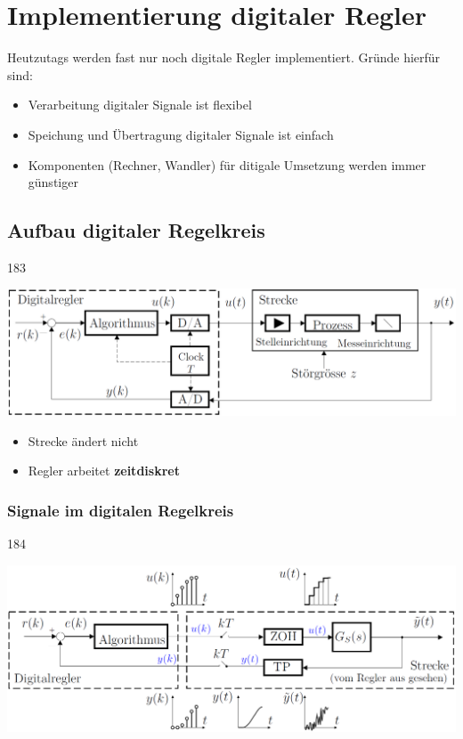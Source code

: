 \section{Implementierung digitaler Regler}

Heutzutags werden fast nur noch digitale Regler implementiert. Gründe hierfür sind:

\begin{itemize}
    \item Verarbeitung digitaler Signale ist flexibel
    \item Speichung und Übertragung digitaler Signale ist einfach
    \item Komponenten (Rechner, Wandler) für ditigale Umsetzung werden immer günstiger
\end{itemize}


\subsection{Aufbau digitaler Regelkreis}{183}

\begin{minipage}[c]{0.63\columnwidth}
    \includegraphics[width=\columnwidth]{images/regelkreis_mit_digitalregler.png}
\end{minipage}
\hfill
\begin{minipage}[c]{0.35\columnwidth}
    \begin{itemize}
        \item Strecke ändert nicht
        \item Regler arbeitet \textbf{zeitdiskret}
    \end{itemize}
\end{minipage}


\subsubsection{Signale im digitalen Regelkreis}{184}

\begin{center}
    \includegraphics[width=0.75\columnwidth]{images/digitaler_regelkreis_signaltypen.png}
\end{center}


